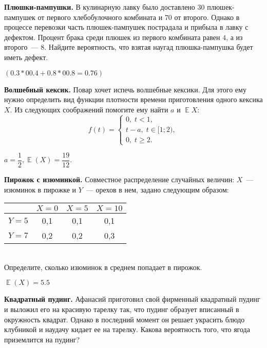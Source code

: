 \documentclass[12pt, addpoints]{exam} %
\DeclareMathOperator{\E}{\mathbb{E}}
\renewcommand{\geq}{\geqslant}
\begin{document}
\begin{questions}

\question \textbf{Плюшки-пампушки.} В кулинарную лавку было доставлено $30$ плюшек-пампушек от первого хлебобулочного комбината и $70$ от второго. Однако в процессе перевозки часть плюшек-пампушек пострадала и прибыла в лавку с дефектом. Процент брака среди плюшек из первого комбината равен $4$, а из второго~--- $8$. Найдите вероятность, что взятая наугад плюшка-пампушка будет иметь дефект.
\begin{solution}
$ (0.3*00.4 + 0.8*00.8 = 0.76) $
\end{solution}


\question \textbf{Волшебный кексик.} Повар хочет испечь волшебные кексики. Для этого ему нужно определить вид функции плотности времени приготовления одного кексика $X$. Из следующих соображений помогите ему найти $a$ и $\E X$:
		\[
		f(t)=\begin{cases}
		0, \; t< 1, \\
		t-a, \; t \in [1;2), \\
		0, \; t \geq 2.
		\end{cases}
		\]

\begin{solution}
$a=\dfrac{1}{2}, \E(X)=\dfrac{19}{12}.$
\end{solution}

\question \textbf{Пирожок с изюминкой. } Совместное распределение случайных величин: $X$~--- изюминок в пирожке и $Y$~---  орехов в нем, задано следующим образом:

		\begin{tabular}{c|c|c|c|}
			\centering
			& $X=0$ & $X=5$  & $X=10$  \\
			\hline $Y=5$ & 0,1 & 0,1 & 0,1 \\
			\hline  $Y=7$&  0,2& 0,2 & 0,3 \\
			\hline
		\end{tabular} \\
		Определите, сколько изюминок в среднем попадает в пирожок.

\begin{solution}
$\E(X)=5.5$
\end{solution}

\question \textbf{Квадратный пудинг.} Афанасий приготовил свой фирменный квадратный пудинг и выложил его на красивую тарелку так, что пудинг образует вписанный в окружность квадрат. Однако в последний момент он решает украсить блюдо клубникой и наудачу кидает ее на тарелку. Какова вероятность того, что ягода приземлится на пудинг?


\end{questions}
\end{document}
